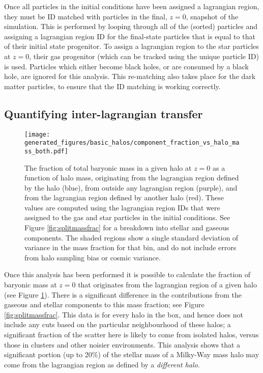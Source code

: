 Once all particles in the initial conditions have been assigned a lagrangian
region, they must be ID matched with particles in the final, $z=0$, snapshot of
the simulation. This is performed by looping through all of the (sorted)
particles and assigning a lagrangian region ID for the final-state particles
that is equal to that of their initial state progenitor. To assign a
lagrangian region to the star particles at $z=0$, their gas progenitor
(which can be tracked using the unique particle ID) is used. Particles which
either become black holes, or are consumed by a black hole, are ignored for
this analysis. This re-matching also takes place for the dark matter
particles, to ensure that the ID matching is working correctly.

\subsection{Quantifying inter-lagrangian transfer}

\begin{figure} \centering
\texttt{[image: generated\_figures/basic\_halos/component\_fraction\_vs\_halo\_mass\_both.pdf]}
 \caption{The fraction of total baryonic mass in a given halo at $z=0$ as a
 function of halo mass, originating from the lagrangian region defined by the
 halo (blue), from outside any lagrangian region (purple), and from the
 lagrangian region defined by another halo (red). These values are computed
 using the lagrangian region IDs that were assigned to the gas and star
 particles in the initial conditions. See Figure \ref{fig:splitmassfrac} for
 a breakdown into stellar and gaseous components. The shaded regions show a
 single standard deviation of variance in the mass fraction for that bin, and
 do not include errors from halo sampling bias or cosmic variance.}
 \label{fig:massfrac}
 \end{figure}

Once this analysis has been performed it is possible to calculate the fraction of
baryonic mass at $z=0$ that originates from the lagrangian region of a given
halo (see Figure \ref{fig:massfrac}). There is a significant difference in the
contributions from the gaseous and stellar components to this mass fraction;
see Figure \ref{fig:splitmassfrac}. This data is for every halo in the box, and
hence does not include any cuts based on the particular neighbourhood of these
halos; a significant fraction of the scatter here is likely to come from
isolated halos, versus those in clusters and other noisier environments. This
analysis shows that a significant portion (up to 20\%) of the stellar mass of a
Milky-Way mass halo may come from the lagrangian region as defined by a
\emph{different halo}.

